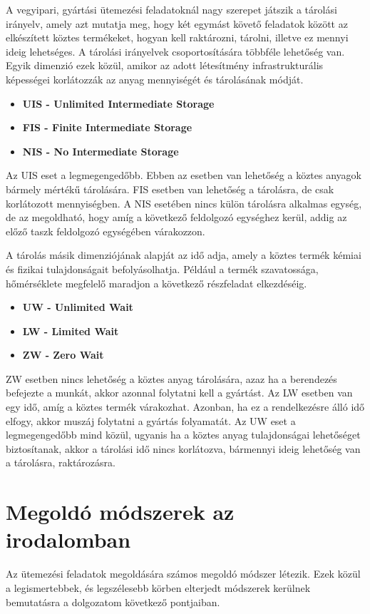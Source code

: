 \newpage
A vegyipari, gyártási ütemezési feladatoknál nagy szerepet játszik a tárolási irányelv, amely azt mutatja meg, hogy két egymást követő feladatok között az elkészített köztes termékeket, hogyan kell raktározni, tárolni, illetve ez mennyi ideig lehetséges. A tárolási irányelvek csoportosítására többféle lehetőség van. Egyik dimenzió ezek közül, amikor az adott létesítmény infrastrukturális képességei korlátozzák az anyag mennyiségét és tárolásának módját.
\begin{itemize}
	\item \textbf{UIS - Unlimited Intermediate Storage}
	\item \textbf{FIS - Finite Intermediate Storage}
	\item \textbf{NIS - No Intermediate Storage}
\end{itemize}
Az UIS eset a legmegengedőbb. Ebben az esetben van lehetőség a köztes anyagok bármely mértékű tárolására. FIS esetben van lehetőség a tárolásra, de csak korlátozott mennyiségben. A NIS esetében nincs külön tárolásra alkalmas egység, de az megoldható, hogy amíg a következő feldolgozó egységhez kerül, addig az előző taszk feldolgozó egységében várakozzon.	

A tárolás másik dimenziójának alapját az idő adja, amely a köztes termék kémiai és fizikai tulajdonságait befolyásolhatja. Például a termék szavatossága, hőmérséklete megfelelő maradjon a következő részfeladat elkezdéséig.	
\begin{itemize}
	\item \textbf{UW - Unlimited Wait}
	\item \textbf{LW - Limited Wait}
	\item \textbf{ZW - Zero Wait}	
\end{itemize}
ZW esetben nincs lehetőség a köztes anyag tárolására, azaz ha a berendezés befejezte a munkát, akkor azonnal folytatni kell a gyártást. Az LW esetben van egy idő, amíg a köztes termék várakozhat. Azonban, ha ez a rendelkezésre álló idő elfogy, akkor muszáj folytatni a gyártás folyamatát. Az UW eset a legmegengedőbb mind közül, ugyanis ha a köztes anyag tulajdonságai lehetőséget biztosítanak, akkor a tárolási idő nincs korlátozva, bármennyi ideig lehetőség van a tárolásra, raktározásra.

\newpage
\section{Megoldó módszerek az irodalomban}
Az ütemezési feladatok megoldására számos megoldó módszer létezik. Ezek közül a legismertebbek, és legszélesebb körben elterjedt módszerek kerülnek bemutatásra a dolgozatom következő pontjaiban.


